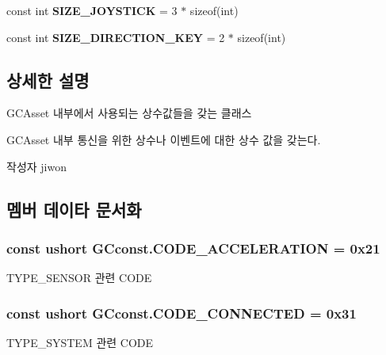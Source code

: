 \begin{DoxyCompactItemize}
\item 
\hypertarget{class_g_cconst_aa79a153c70b038789d1970014fe78fdd}{}const int {\bfseries S\+I\+Z\+E\+\_\+\+J\+O\+Y\+S\+T\+I\+C\+K} = 3 $\ast$ sizeof(int)\label{class_g_cconst_aa79a153c70b038789d1970014fe78fdd}

\item 
\hypertarget{class_g_cconst_ade9e9f452273b6219344ed7f6e45b3db}{}const int {\bfseries S\+I\+Z\+E\+\_\+\+D\+I\+R\+E\+C\+T\+I\+O\+N\+\_\+\+K\+E\+Y} = 2 $\ast$ sizeof(int)\label{class_g_cconst_ade9e9f452273b6219344ed7f6e45b3db}

\end{DoxyCompactItemize}


\subsection{상세한 설명}
G\+C\+Asset 내부에서 사용되는 상수값들을 갖는 클래스

G\+C\+Asset 내부 통신을 위한 상수나 이벤트에 대한 상수 값을 갖는다. \begin{DoxyAuthor}{작성자}
jiwon 
\end{DoxyAuthor}


\subsection{멤버 데이타 문서화}
\hypertarget{class_g_cconst_a84fdd379bbb0355e8d1abec0338c7305}{}
\subsubsection[{C\+O\+D\+E\+\_\+\+A\+C\+C\+E\+L\+E\+R\+A\+T\+I\+O\+N}]{\setlength{\rightskip}{0pt plus 5cm}const ushort G\+Cconst.\+C\+O\+D\+E\+\_\+\+A\+C\+C\+E\+L\+E\+R\+A\+T\+I\+O\+N = 0x21}\label{class_g_cconst_a84fdd379bbb0355e8d1abec0338c7305}
T\+Y\+P\+E\+\_\+\+S\+E\+N\+S\+O\+R 관련 C\+O\+D\+E \hypertarget{class_g_cconst_a03588045b902424b55b70524bd81a7d0}{}
\subsubsection[{C\+O\+D\+E\+\_\+\+C\+O\+N\+N\+E\+C\+T\+E\+D}]{\setlength{\rightskip}{0pt plus 5cm}const ushort G\+Cconst.\+C\+O\+D\+E\+\_\+\+C\+O\+N\+N\+E\+C\+T\+E\+D = 0x31}\label{class_g_cconst_a03588045b902424b55b70524bd81a7d0}
T\+Y\+P\+E\+\_\+\+S\+Y\+S\+T\+E\+M 관련 C\+O\+D\+E \hypertarget{class_g_cconst_a33241116bb534c10ba1a5400547a74b0}{}

